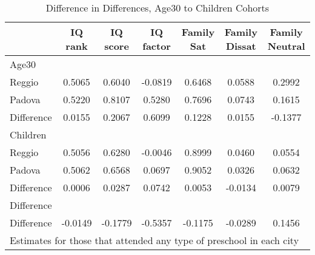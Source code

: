\begin{table}[htbp]\centering
\caption{Difference in Differences, Age30 to Children Cohorts}
\begin{tabular}{l*{6}{c}}
\hline\hline
            &     IQ rank&    IQ score&   IQ factor&  Family Sat&Family Dissat&Family Neutral\\
\hline
Age30       &            &            &            &            &            &            \\
Reggio      &      0.5065&      0.6040&     -0.0819&      0.6468&      0.0588&      0.2992\\
Padova      &      0.5220&      0.8107&      0.5280&      0.7696&      0.0743&      0.1615\\
Difference  &      0.0155&      0.2067&      0.6099&      0.1228&      0.0155&     -0.1377\\
\hline
Children    &            &            &            &            &            &            \\
Reggio      &      0.5056&      0.6280&     -0.0046&      0.8999&      0.0460&      0.0554\\
Padova      &      0.5062&      0.6568&      0.0697&      0.9052&      0.0326&      0.0632\\
Difference  &      0.0006&      0.0287&      0.0742&      0.0053&     -0.0134&      0.0079\\
\hline
Difference  &            &            &            &            &            &            \\
Difference  &     -0.0149&     -0.1779&     -0.5357&     -0.1175&     -0.0289&      0.1456\\
\hline\hline
\multicolumn{7}{l}{\footnotesize Estimates for those that attended any type of preschool in each city}\\
\end{tabular}
\end{table}
